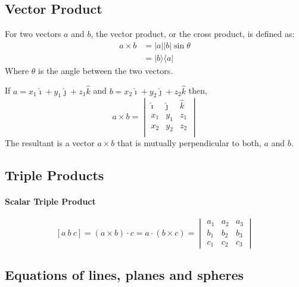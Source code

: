 \subsection{Vector Product}
\begin{defn}
For two vectors $a$ and $b$, the vector product, or the cross product, is defined as:
\begin{align*}
a\times b &= \lvert a \rvert \lvert b \rvert \sin\theta \\
&=|b\rangle \langle a|
\end{align*}
Where $\theta$ is the angle between the two vectors.
\end{defn}
If $a = x_1 \hat{\imath} + y_1 \hat{\jmath} + z_1 \hat{k}$ and $b = x_2 \hat{\imath} + y_2 \hat{\jmath} + z_2 \hat{k}$ then,
$$
a \times b =
\begin{vmatrix}
\hat{\imath} & \hat{\jmath} & \hat{k} \\
x_1 & y_1 & z_1 \\
x_2 & y_2 & z_2 \\
\end{vmatrix}
$$
The resultant is a vector $a\times{b}$ that is mutually perpendicular to both, $a$ and $b$.
\subsection{Triple Products}
\paragraph{Scalar Triple Product}
$$[a\  b\  c] = (a\times b)\cdot c = a\cdot(b\times c) = \begin{vmatrix}
a_1 & a_2 & a_3 \\
b_1 & b_2 & b_3 \\
c_1 & c_2 & c_3
\end{vmatrix}$$
\subsection{Equations of lines, planes and spheres}

